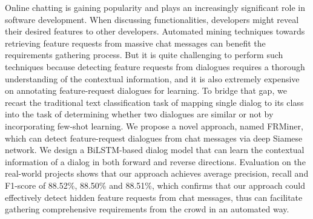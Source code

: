 Online chatting is gaining popularity and plays an increasingly significant role in software development. When discussing functionalities, developers might reveal their desired features to other developers. Automated mining techniques towards retrieving feature requests from massive chat messages can benefit the requirements gathering process. But it is quite challenging to perform such techniques because detecting feature requests from dialogues requires a thorough understanding of the contextual information, and it is also extremely expensive on annotating feature-request dialogues for learning. 
To bridge that gap, we recast the traditional text classification task of mapping single dialog to its class into the task of determining whether two dialogues are similar or not by incorporating few-shot learning. We
propose a novel approach, named {FRMiner}, which can detect feature-request dialogues from chat messages via deep Siamese network. We design a BiLSTM-based dialog model that can learn the contextual information of a dialog in both forward and reverse directions.
Evaluation on the real-world projects shows that our approach achieves average precision, recall and F1-score of 88.52\%, 88.50\% and 88.51\%, which confirms that our approach could effectively detect hidden feature requests from chat messages, thus can facilitate gathering comprehensive requirements from the crowd in an automated way. 

